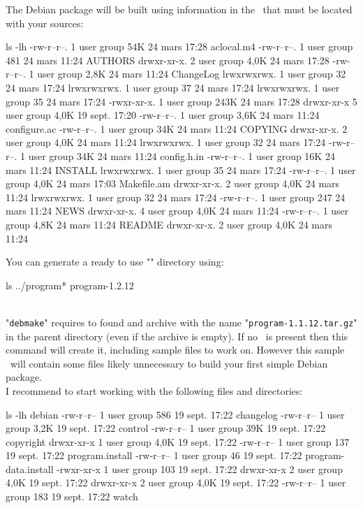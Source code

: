 The Debian package will be built using information in the \ddir\ that must be located with your sources:
{\scriptsize{
\begin{script}
 ls -lh
-rw-r--r--.  1 user group  54K 24 mars  17:28 aclocal.m4
-rw-r--r--.  1 user group  481 24 mars  11:24 AUTHORS
drwxr-xr-x.  2 user group 4,0K 24 mars  17:28 
-rw-r--r--.  1 user group 2,8K 24 mars  11:24 ChangeLog
lrwxrwxrwx.  1 user group   32 24 mars  17:24 
lrwxrwxrwx.  1 user group   37 24 mars  17:24 
lrwxrwxrwx.  1 user group   35 24 mars  17:24 
-rwxr-xr-x.  1 user group 243K 24 mars  17:28 
drwxr-xr-x   5 user group 4,0K 19 sept. 17:20 
-rw-r--r--.  1 user group 3,6K 24 mars  11:24 configure.ac
-rw-r--r--.  1 user group  34K 24 mars  11:24 COPYING
drwxr-xr-x.  2 user group 4,0K 24 mars  11:24 
lrwxrwxrwx.  1 user group   32 24 mars  17:24 
-rw-r--r--.  1 user group  34K 24 mars  11:24 config.h.in
-rw-r--r--.  1 user group  16K 24 mars  11:24 INSTALL
lrwxrwxrwx.  1 user group   35 24 mars  17:24 
-rw-r--r--.  1 user group 4,0K 24 mars  17:03 Makefile.am
drwxr-xr-x.  2 user group 4,0K 24 mars  11:24 
lrwxrwxrwx.  1 user group   32 24 mars  17:24 
-rw-r--r--.  1 user group  247 24 mars  11:24 NEWS
drwxr-xr-x.  4 user group 4,0K 24 mars  11:24 
-rw-r--r--.  1 user group 4,8K 24 mars  11:24 README
drwxr-xr-x.  2 user group 4,0K 24 mars  11:24 
\end{script}
}}
\noindent You can generate a ready to use "" directory using: 
\vspace{-0.25cm}
{\footnotesize{
\begin{script}
 ls ../program*
program-1.2.12  
 
\end{script}
}}
\\[-0.5cm]
\noindent "\texttt{debmake}" requires to found and archive with the name "\texttt{program-1.1.12.tar.gz}" in the parent directory (even if the archive is empty). If no \ddir\ is present then this command will create it, including sample files to work on. 
However this sample \ddir\ will contain some files likely unnecessary to build your first simple Debian package. \\[0.25cm]
I recommend to start working with the following files and directories:
{\footnotesize{
\begin{script}
 ls -lh debian
-rw-r--r-- 1 user group  586 19 sept. 17:22 changelog
-rw-r--r-- 1 user group 3,2K 19 sept. 17:22 control
-rw-r--r-- 1 user group  39K 19 sept. 17:22 copyright
drwxr-xr-x 1 user group 4,0K 19 sept. 17:22 
-rw-r--r-- 1 user group  137 19 sept. 17:22 program.install
-rw-r--r-- 1 user group   46 19 sept. 17:22 program-data.install
-rwxr-xr-x 1 user group  103 19 sept. 17:22 
drwxr-xr-x 2 user group 4,0K 19 sept. 17:22 
drwxr-xr-x 2 user group 4,0K 19 sept. 17:22 
-rw-r--r-- 1 user group  183 19 sept. 17:22 watch
\end{script}
}}
